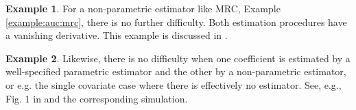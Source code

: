 \documentclass[12pt]{article}
\theoremstyle{definition}
\newtheorem{example}{Example}%
\begin{document}
\begin{example}
  For a non-parametric estimator like MRC, Example \ref{example:auc:mrc}, there
  is no further difficulty. Both estimation procedures have a
  vanishing derivative. This example is discussed in \citet{heller2017}.
\end{example}
\begin{example}Likewise, there is no difficulty when one coefficient
  is estimated by a well-specified parametric estimator and the other
  by a non-parametric estimator, or e.g.  the single covariate case
  where there is effectively no estimator. %
See, e.g., Fig. 1 in \citet{demler2017} and the corresponding simulation.
\end{example}

\end{document}
